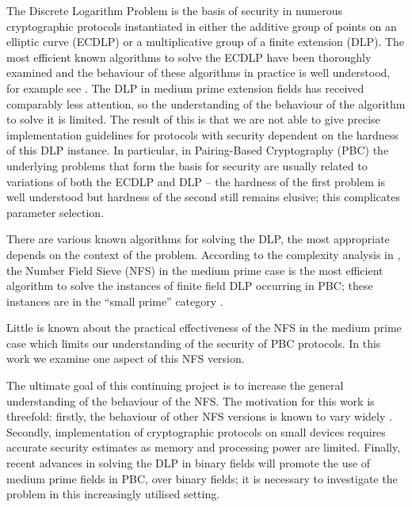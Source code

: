 \documentclass[a4paper, 12pt, envcountsect, runningheads]{llncs}
\numberwithin{figure}{section}
\numberwithin{equation}{section}
\begin{document}
The Discrete Logarithm Problem is the basis of security in numerous cryptographic protocols instantiated in either the additive group of points on an elliptic curve (ECDLP) or a multiplicative group of a finite extension (DLP). 
The most efficient known algorithms to solve the ECDLP have been thoroughly examined and the behaviour of these algorithms in practice is well understood, for example see \cite{pollard,teske,rho_chal_1,rho_chal_2,rho_efficiency}. The DLP in medium prime extension fields has received comparably less attention, so the understanding of the behaviour of the algorithm to solve it is limited. The result of this is that we are not able to give precise implementation guidelines for protocols with security dependent on the hardness of this DLP instance. In particular, in Pairing-Based Cryptography (PBC) the underlying problems that form the basis for security are usually related to variations of both the ECDLP and DLP -- the hardness of the first problem is well understood but hardness of the second still remains elusive; this complicates parameter selection.


There are various known algorithms for solving the DLP, the most appropriate depends on the context of the problem. According to the complexity analysis in \cite{joux-lercier-smart-vercauteren06}, the Number Field Sieve (NFS) in the medium prime case is the most efficient algorithm to solve the instances of finite field DLP occurring in PBC; these instances are in the ``small prime'' category \cite[Section 3.1]{joux-lercier-smart-vercauteren06}. 

Little is known about the practical effectiveness of the NFS in the medium prime case which limits our understanding of the security of PBC protocols. In this work we examine one aspect of this NFS version.

The ultimate goal of this continuing project is to increase the general understanding of the behaviour of the NFS. The motivation for this work is threefold: firstly, the behaviour of other NFS versions is known to vary widely \cite{zajac,dan_predicting_nfs}. Secondly, implementation of cryptographic protocols on small devices requires accurate security estimates as memory and processing power are limited. Finally, recent advances in solving the DLP in binary fields \cite{FFS_rob, FFS_antoine, joux_imporved} will promote the use of medium prime fields in PBC, over binary fields; it is necessary to investigate the problem in this increasingly utilised setting.
\end{document}
